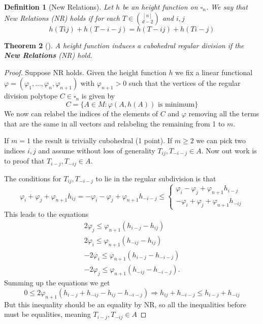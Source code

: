 \documentclass[leqno]{article}
\numberwithin{equation}{section}
\newtheorem{theorem}{Theorem}
\numberwithin{theorem}{section}
\newtheorem{definition}[theorem]{Definition}
\begin{document}
\begin{definition}[New Relations] Let $h$ be an height function on $\square_n$.
We say that New Relations (NR) holds if for each $T\in \binom{[n]}{d-2}$ and $i, j$
\[
h(Tij)+ h(T-i-j) = h(T-ij) + h(Ti-j)
\] 
\end{definition}
\begin{theorem}[] A height function induces a cubohedral regular division if the \textbf{New Relations} (NR) hold.
\end{theorem}

\begin{proof}
  
Suppose NR holds. Given the height function $h$ we fix a linear functional  $\varphi = (\varphi _1, \ldots, \varphi _n, \varphi _{n+1})$ with $\varphi _{n+1}>0$ such that the vertices of the regular division polytope $C\in \square_n$ is given by
\[
C = \{A \in M: \varphi (A, h(A)) \text{ is minimum}\}
\] 
We now can relabel the indices of the elements of $C$ and $\varphi $ removing all the terms that are the same in all vectors and relabeling the remaining from 1 to $m$.

If  $m = 1$ the result is trivially cubohedral (1 point). If  $m\ge 2$ we can pick two indices $i, j$ and assume without loss of generality  $T_{ij}, T_{-i-j}\in A$. Now out work is to proof that $T_{i-j}, T_{-ij} \in A$.

The conditions for $T_{ij}, T_{-i-j}$ to lie in the regular subdivision is that 
\[
\varphi _i + \varphi _j + \varphi _{n+1}h_{ij} = -\varphi _i -\varphi _j + \varphi _{n+1}h_{-i-j} \le \begin{cases}
  \varphi _i -\varphi _j + \varphi _{n+1}h_{i-j} \\
  -\varphi _i + \varphi _j + \varphi _{n+1}h_{-ij}
\end{cases}
\] 
This leads to the equations
\begin{align*}
  2\varphi _j\le \varphi _{n+1}(h_{i-j}- h_{ij}) \\
  2\varphi _i\le \varphi _{n+1}(h_{-ij}- h_{ij}) \\
  -2\varphi _i\le \varphi _{n+1}(h_{i-j}- h_{-i-j}) \\
  -2\varphi _j\le \varphi _{n+1}(h_{-ij}- h_{-i-j})
.\end{align*}
Summing up the equations we get
\[
0\le 2\varphi_{n+1}(h_{i-j} + h_{-ij}-h_{ij}-h_{-i-j}) \Rightarrow h_{ij} + h_{-i-j} \le h_{i-j} + h_{-ij}
\] 
But this inequality should be an equality by NR, so all the inequalities before must be equalities, meaning $T_{i-j}, T_{-ij}\in A$ 

\end{proof}
\end{document}
